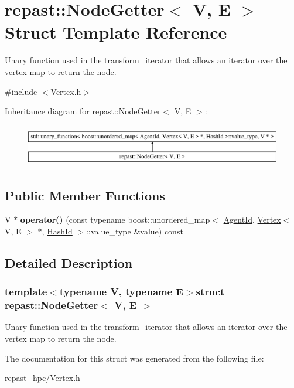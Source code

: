 \hypertarget{structrepast_1_1_node_getter}{\section{repast\-:\-:Node\-Getter$<$ V, E $>$ Struct Template Reference}
\label{structrepast_1_1_node_getter}
}


Unary function used in the transform\-\_\-iterator that allows an iterator over the vertex map to return the node.  




{\ttfamily \#include $<$Vertex.\-h$>$}

Inheritance diagram for repast\-:\-:Node\-Getter$<$ V, E $>$\-:\begin{figure}[H]
\begin{center}
\leavevmode
\includegraphics[height=1.876047cm]{structrepast_1_1_node_getter}
\end{center}
\end{figure}
\subsection*{Public Member Functions}
\begin{DoxyCompactItemize}
\item 
\hypertarget{structrepast_1_1_node_getter_af738a8ad2b713303a0e95132588864fb}{V $\ast$ {\bfseries operator()} (const typename boost\-::unordered\-\_\-map$<$ \hyperlink{classrepast_1_1_agent_id}{Agent\-Id}, \hyperlink{classrepast_1_1_vertex}{Vertex}$<$ V, E $>$ $\ast$, \hyperlink{structrepast_1_1_hash_id}{Hash\-Id} $>$\-::value\-\_\-type \&value) const }\label{structrepast_1_1_node_getter_af738a8ad2b713303a0e95132588864fb}

\end{DoxyCompactItemize}


\subsection{Detailed Description}
\subsubsection*{template$<$typename V, typename E$>$struct repast\-::\-Node\-Getter$<$ V, E $>$}

Unary function used in the transform\-\_\-iterator that allows an iterator over the vertex map to return the node. 

The documentation for this struct was generated from the following file\-:\begin{DoxyCompactItemize}
\item 
repast\-\_\-hpc/Vertex.\-h\end{DoxyCompactItemize}
